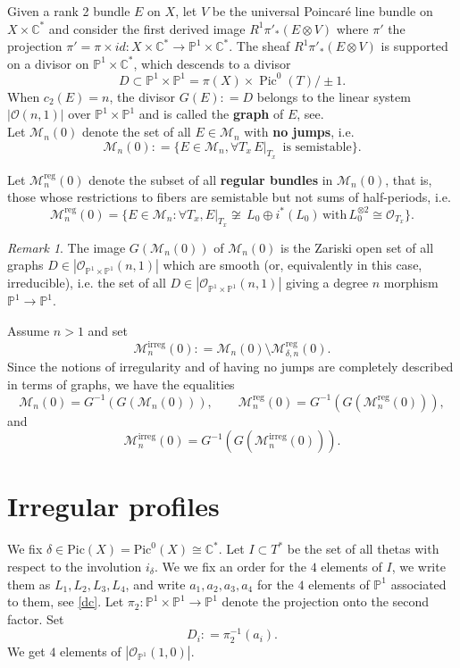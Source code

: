 \documentclass[10pt,a4paper]{amsart}
\theoremstyle{plain}
\theoremstyle{definition}
\theoremstyle{remark}
\newtheorem{remark}{Remark}
\DeclareMathOperator{\Pic}{Pic}
\DeclareMathOperator{\irreg}{irreg}
\DeclareMathOperator{\reg}{reg}
\newcommand{\ce}{\mathrel{\mathop:}=}
\begin{document}
Given a rank 2 bundle $E$ on $X$, let $V$ be the universal Poincaré line bundle on
$X \times \mathbb C^*$ and consider the first derived image $R^1\pi'_*(E \otimes V)$ where
$\pi'$  the projection $\pi'= \pi\times id \colon X\times \mathbb C^* \to \mathbb P^1 \times \mathbb C^*$. 
The sheaf $R^1\pi'_*(E \otimes V)$ is supported on a divisor on $ \mathbb P^1\times \mathbb C^*$, 
which descends to a divisor 
$$D \subset \mathbb P^1\times \mathbb P^1 = \pi(X) \times \Pic^0(T)/\pm1.$$ When $c_2(E)=n$, the divisor
 $G(E) \ce D $ belongs to the linear system $|\mathcal O(n,1)|$ over $\mathbb P^1\times \mathbb P^1$
 and is called the {\bf graph} of $E$, see\cite[Prop..3]{BH}. \\

Let  $\mathcal M_n(0)$ denote the set of all $E\in  \mathcal M_n$ with {\bf no jumps}, i.e.
$$\mathcal M_n(0) \ce  \{E\in  \mathcal M_n,  \forall T_x \, E\vert_{T_x}\, \text{ is semistable}\}.$$

 Let  $\mathcal M_n^{\reg}(0)$ denote the subset of all {\bf regular bundles} in $\mathcal M_n(0)$, that is, 
 those whose restrictions to fibers are semistable but not sums of  half-periods, i.e.
 $$\mathcal M_n^{\reg}(0)= \{E\in  \mathcal M_n: \forall   T_x, 
  E\vert_{T_x}   \not\cong  \, L_0\oplus i^\ast(L_0) \, \text{with}\, L_0^{\otimes 2} \cong \mathcal O_{T_x} \}.$$

\begin{remark}The image $G(\mathcal M_n(0))$ of $\mathcal M_n(0)$ is the Zariski open set of all graphs $D\in |\mathcal O_{\mathbb P^1\times \mathbb P^1}(n,1)|$ which are smooth (or, equivalently in this case, irreducible), i.e. the set of all $D\in |\mathcal O_{\mathbb P^1\times \mathbb P^1}(n,1)|$ 
giving a degree $n$ morphism $\mathbb P^1\to \mathbb P^1$.
\end{remark}

Assume $n>1$ and set $$\mathcal M_n^{\irreg}(0)\ce \mathcal M_n(0)\setminus \mathcal M^{\reg}_{\delta,n}(0).$$ 
Since the notions of irregularity and of having no jumps are completely 
 described in terms of graphs, we have the equalities
$$ \mathcal M_n(0) =G^{-1}(G(\mathcal M_n(0))), \quad \quad 
 \mathcal M_n^{\reg}(0) =G^{-1}(G(\mathcal M_n^{\reg}(0))),  $$and
$$ \mathcal M_n^{\irreg}(0) =G^{-1}(G(\mathcal M_n^{\irreg}(0))).$$

\section{Irregular profiles}
We fix $\delta\in \mathrm{Pic}(X) =\mathrm{Pic}^0(X)\cong \mathbb C^\ast$. Let $I\subset T^\ast$ be the set of all thetas with respect to the involution $i_\delta$.
We we fix an order for the $4$ elements of $I$,  we write them as $L_1,L_2,L_3,L_4$, and write $a_1, a_2, a_3, a_4$ 
for the $4$ elements of $\mathbb P^1$ associated to them, see \eqref{dc}.
Let $\pi_2\colon \mathbb P^1\times \mathbb P^1\to \mathbb P^1$ denote the projection onto the second factor. 
Set 
$$D_i\ce \pi_2^{-1}(a_i).$$ We get $4$ elements of $|\mathcal O_{\mathbb P^1}(1,0)|$. 
\end{document}
